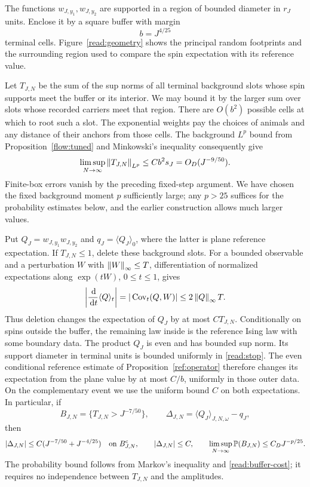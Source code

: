 The functions $w_{J,y_1},w_{J,y_2}$ are supported in a region of bounded
diameter in $r_J$ units.  Enclose it by a square buffer with margin
\begin{equation}
 b=J^{4/25}
 \label{read:buffer-radius}
\end{equation}
terminal cells.  Figure~\ref{read:geometry} shows the principal random
footprints and the surrounding region used to compare the spin
expectation with its reference value.


Let $T_{J,N}$ be the sum of the sup norms of all
terminal background slots whose spin supports meet the buffer or its
interior.  We may bound it by the larger sum over slots whose recorded
carriers meet that region.  There are $O(b^2)$ possible cells at which
to root such a slot.  The exponential weights pay the choices of
animals and any distance of their anchors from those cells.  The
background $L^p$ bound from Proposition~\ref{flow:tuned} and Minkowski's
inequality consequently give
\begin{equation}
 \limsup_{N\to\infty}\left\lVert T_{J,N}\right\rVert_{L^p}
    \le C b^2s_J=O_D(J^{-9/50}).
 \label{read:buffer-cost}
\end{equation}
Finite-box errors vanish by the preceding fixed-step argument.  We
have chosen the fixed background moment $p$ sufficiently large; any
$p>25$ suffices for the probability estimates below, and the earlier
construction allows much larger values.

Put $Q_J=w_{J,y_1}w_{J,y_2}$ and
$q_J=\langle Q_J\rangle_0$, where the latter is plane reference
expectation.  If $T_{J,N}\le1$, delete these background slots.
For a bounded observable and a perturbation $W$ with
$\left\lVert W\right\rVert_\infty\le T$, differentiation of normalized expectations
along $\exp(tW)$, $0\le t\le1$, gives
\[
 \left|\frac{\,\mathrm d}{\,\mathrm d t}\langle Q\rangle_t\right|
   =|\operatorname{Cov}_t(Q,W)|\le2\left\lVert Q\right\rVert_\infty T.
\]
Thus deletion changes the expectation of $Q_J$ by at most $CT_{J,N}$.
Conditionally on spins outside the buffer, the remaining law inside
is the reference Ising law with some boundary data.  The product
$Q_J$ is even and has bounded sup norm.  Its support diameter in
terminal units is bounded uniformly in \eqref{read:stop}.  The even
conditional reference estimate of Proposition~\ref{ref:operator}
therefore changes its expectation from the plane value by at most
$C/b$, uniformly in those outer data.  On the complementary event we
use the uniform bound $C$ on both expectations.  In particular, if
\[
 B_{J,N}=\{T_{J,N}>J^{-7/50}\},
 \qquad
 \Delta_{J,N}=\langle Q_J\rangle_{J,N,\omega}-q_J,
\]
then
\begin{equation}
 |\Delta_{J,N}|\le C(J^{-7/50}+J^{-4/25})
     \quad\hbox{on }B_{J,N}^{\mathrm c},
 \qquad |\Delta_{J,N}|\le C,
 \qquad
 \limsup_{N\to\infty}\mathbb P(B_{J,N})\le C_DJ^{-p/25}.
 \label{read:buffer-good}
\end{equation}
The probability bound follows from Markov's inequality and
\eqref{read:buffer-cost}; it requires no independence between
$T_{J,N}$ and the amplitudes.

